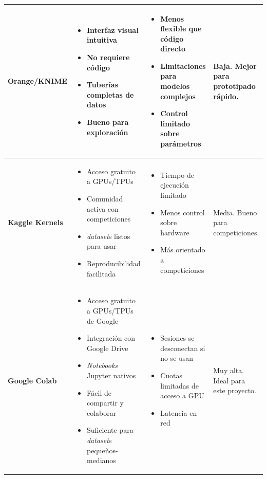 \begin{xltabular}{\textwidth}{@{} >{\centering\arraybackslash}p{0.13\textwidth} >{\raggedright\arraybackslash}X >{\raggedright\arraybackslash}X >{\raggedright\arraybackslash}X @{}}
\bottomrule
\endlastfoot%
	\textbf{Orange/KNIME} &
	\begin{itemize}[nosep] \item Interfaz visual intuitiva \item No requiere código \item Tuberías completas de datos \item Bueno para exploración \end{itemize} &
	\begin{itemize}[nosep] \item Menos flexible que código directo \item Limitaciones para modelos complejos \item Control limitado sobre parámetros \end{itemize} &
	Baja. Mejor para prototipado rápido. \\
	\midrule
	\textbf{Kaggle Kernels} &
	\begin{itemize}[nosep] \item Acceso gratuito a GPUs/TPUs \item Comunidad activa con competiciones \item \textit{dataset}s listos para usar \item Reproducibilidad facilitada \end{itemize} &
	\begin{itemize}[nosep] \item Tiempo de ejecución limitado \item Menos control sobre hardware \item Más orientado a competiciones \end{itemize} &
	Media. Bueno para competiciones. \\
	\midrule
	\textbf{Google Colab} &
	\begin{itemize}[nosep] \item Acceso gratuito a GPUs/TPUs de Google \item Integración con Google Drive \item \textit{Notebooks} Jupyter nativos \item Fácil de compartir y colaborar \item Suficiente para \textit{dataset}s pequeños-medianos \end{itemize} &
	\begin{itemize}[nosep] \item Sesiones se desconectan si no se usan \item Cuotas limitadas de acceso a GPU \item Latencia en red \end{itemize} &
	 Muy alta. Ideal para este proyecto. \\
\end{xltabular}
{\captionsetup{type=table,hypcap=false}\label{tab:comparativa_entornos_ann}}

